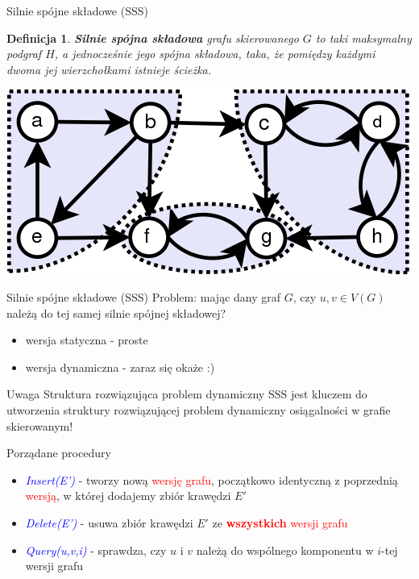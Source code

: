 \documentclass{beamer}
\newtheorem{df}{Definicja}
\newcommand{\emp}[1]{\textcolor{blue}{\textit{#1}}}
\newcommand{\red}[1]{\textcolor{red}{#1}}
\begin{document}
\begin{frame}{Silnie spójne składowe (SSS)}

\begin{df}
{\bf Silnie spójna składowa} grafu skierowanego $G$ to taki maksymalny podgraf $H$, a jednocześnie jego spójna składowa, taka, że pomiędzy każdymi dwoma jej wierzchołkami istnieje ścieżka.
\end{df}

\begin{center}
\includegraphics[scale=0.5]{Scc.png}
\end{center}

\end{frame}

\begin{frame}{Silnie spójne składowe (SSS)}
Problem: mając dany graf $G$, czy $u,v \in V(G)$ należą do tej samej silnie spójnej składowej?

\vspace{0.5cm}

\begin{itemize}
\item wersja statyczna - proste
\item wersja dynamiczna - zaraz się okaże :)
\end{itemize}

\vspace{0.5cm}

\begin{block}{Uwaga}
Struktura rozwiązująca problem dynamiczny SSS jest kluczem do utworzenia struktury rozwiązującej problem dynamiczny osiągalności w grafie skierowanym!
\end{block}

\end{frame}

\begin{frame}{Porządane procedury}

\begin{itemize}
\item \emp{Insert(E')} - tworzy nową \red{wersję grafu}, początkowo identyczną z poprzednią \red{wersją}, w której dodajemy zbiór krawędzi $E'$
\item \emp{Delete(E')} - usuwa zbiór krawędzi $E'$ ze \red{{\bf wszystkich} wersji grafu}
\item \emp{Query(u,v,i)} - sprawdza, czy $u$ i $v$ należą do wspólnego komponentu w $i$-tej wersji grafu
\end{itemize}

\end{frame}
\end{document}
